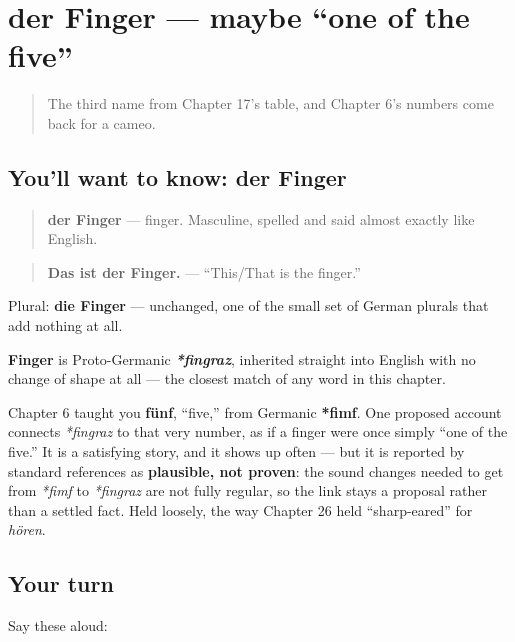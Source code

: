 \section[der Finger]{der Finger — maybe \textquotedblleft{}one of the five\textquotedblright{}}

\label{lesson:GE-C31-finger}



\begin{quote}
The third name from Chapter 17's table, and Chapter 6's numbers come back for a cameo.
\end{quote}

\subsection*{You'll want to know: der Finger}
\begin{quote}
\textbf{der Finger} — finger. Masculine, spelled and said almost exactly like English.
\end{quote}

\begin{quote}
\textbf{Das ist der Finger.} — \textquotedblleft{}This/That is the finger.\textquotedblright{}
\end{quote}

Plural: \textbf{die Finger} — unchanged, one of the small set of German plurals that add nothing at all.

\begin{cousinweb}
\textbf{Finger} is Proto-Germanic \emph{\textbf{*fingraz}}, inherited straight into English with no change of shape at all — the closest match of any word in this chapter.
\end{cousinweb}

\begin{culture}
Chapter 6 taught you \textbf{fünf}, \textquotedblleft{}five,\textquotedblright{} from Germanic \textbf{*fimf}. One proposed account connects \emph{*fingraz} to that very number, as if a finger were once simply \textquotedblleft{}one of the five.\textquotedblright{} It is a satisfying story, and it shows up often — but it is reported by standard references as \textbf{plausible, not proven}: the sound changes needed to get from \emph{*fimf} to \emph{*fingraz} are not fully regular, so the link stays a proposal rather than a settled fact. Held loosely, the way Chapter 26 held \textquotedblleft{}sharp-eared\textquotedblright{} for \emph{hören}.
\end{culture}

\subsection*{Your turn}
Say these aloud:

